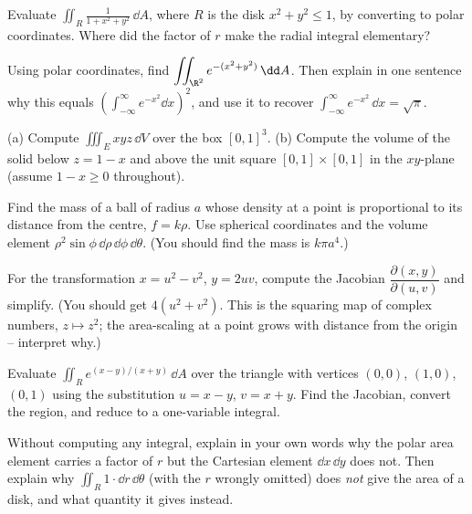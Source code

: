 \begin{exercise}
Evaluate $\displaystyle\iint_R \frac{1}{1+x^2+y^2}\,\dd A$, where $R$ is the disk
$x^2+y^2\le 1$, by converting to polar coordinates. Where did the factor of $r$
make the radial integral elementary?
\end{exercise}

\begin{exercise}
Using polar coordinates, find
$\displaystyle\iint_{\R^2} e^{-(x^2+y^2)}\,\dd A$. Then explain in one sentence
why this equals $\left(\int_{-\infty}^\infty e^{-x^2}\dd x\right)^2$, and use it
to recover $\int_{-\infty}^\infty e^{-x^2}\,\dd x=\sqrt\pi$.
\end{exercise}

\begin{exercise}
(a) Compute $\displaystyle\iiint_E xyz\,\dd V$ over the box $[0,1]^3$.
(b) Compute the volume of the solid below $z=1-x$ and above the unit square
$[0,1]\times[0,1]$ in the $xy$-plane (assume $1-x\ge 0$ throughout).
\end{exercise}

\begin{exercise}
Find the mass of a ball of radius $a$ whose density at a point is proportional to
its distance from the centre, $f=k\rho$. Use spherical coordinates and the volume
element $\rho^2\sin\phi\,\dd\rho\,\dd\phi\,\dd\theta$. (You should find the mass is
$k\pi a^4$.)
\end{exercise}

\begin{exercise}
For the transformation $x=u^2-v^2$, $y=2uv$, compute the Jacobian
$\dfrac{\partial(x,y)}{\partial(u,v)}$ and simplify. (You should get
$4(u^2+v^2)$. This is the squaring map of complex numbers, $z\mapsto z^2$; the
area-scaling at a point grows with distance from the origin -- interpret why.)
\end{exercise}

\begin{exercise}
Evaluate $\displaystyle\iint_R e^{(x-y)/(x+y)}\,\dd A$ over the triangle with
vertices $(0,0)$, $(1,0)$, $(0,1)$ using the substitution $u=x-y$, $v=x+y$.
Find the Jacobian, convert the region, and reduce to a one-variable integral.
\end{exercise}

\begin{exercise}
Without computing any integral, explain in your own words why the polar area
element carries a factor of $r$ but the Cartesian element $\dd x\,\dd y$ does not.
Then explain why $\iint_R 1\cdot\dd r\,\dd\theta$ (with the $r$ wrongly omitted)
does \emph{not} give the area of a disk, and what quantity it gives instead.
\end{exercise}

